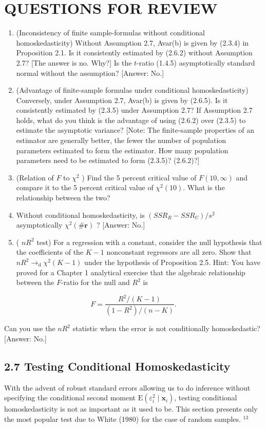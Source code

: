 \documentclass[10pt]{article}
\begin{document}
\section*{QUESTIONS FOR REVIEW}
\begin{enumerate}
  \item (Inconsistency of finite sample-formulas without conditional homoskedasticity) Without Assumption 2.7, Avar(b) is given by (2.3.4) in Proposition 2.1. Is it consistently estimated by (2.6.2) without Assumption 2.7? [The answer is no. Why?] Is the $t$-ratio (1.4.5) asymptotically standard normal without the assumption? [Answer: No.]
  \item (Advantage of finite-sample formulas under conditional homoskedasticity) Conversely, under Assumption 2.7, Avar(b) is given by (2.6.5). Is it consistently estimated by (2.3.5) under Assumption 2.7? If Assumption 2.7 holds, what do you think is the advantage of using (2.6.2) over (2.3.5) to estimate the asymptotic variance? [Note: The finite-sample properties of an estimator are generally better, the fewer the number of population parameters estimated to form the estimator. How many population parameters need to be estimated to form (2.3.5)? (2.6.2)?]
  \item (Relation of $F$ to $\chi^{2}$ ) Find the 5 percent critical value of $F(10, \infty)$ and compare it to the 5 percent critical value of $\chi^{2}(10)$. What is the relationship between the two?
  \item Without conditional homoskedasticity, is $\left(S S R_{R}-S S R_{U}\right) / s^{2}$ asymptotically $\chi^{2}(\# \mathbf{r})$ ? [Answer: No.]
  \item ( $n R^{2}$ test) For a regression with a constant, consider the null hypothesis that the coefficients of the $K-1$ nonconstant regressors are all zero. Show that $n R^{2} \rightarrow_{\mathrm{d}} \chi^{2}(K-1)$ under the hypothesis of Proposition 2.5. Hint: You have proved for a Chapter 1 analytical exercise that the algebraic relationship between the $F$-ratio for the null and $R^{2}$ is
\end{enumerate}

$$
F=\frac{R^{2} /(K-1)}{\left(1-R^{2}\right) /(n-K)} .
$$

Can you use the $n R^{2}$ statistic when the error is not conditionally homoskedastic? [Answer: No.]

\subsection*{2.7 Testing Conditional Homoskedasticity}
With the advent of robust standard errors allowing us to do inference without specifying the conditional second moment $\mathrm{E}\left(\varepsilon_{i}^{2} \mid \mathbf{x}_{i}\right)$, testing conditional homoskedasticity is not as important as it used to be. This section presents only the most popular test due to White (1980) for the case of random samples. ${ }^{13}$
\end{document}
